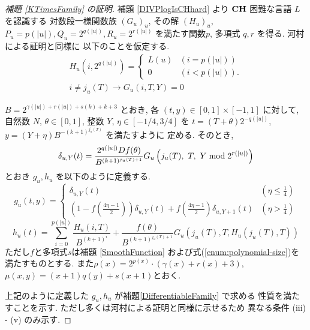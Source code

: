  \begin{proof}[\rm 補題 \ref{KTimesFamily} の証明]
  補題 \ref{DIVPlogIsCHhard} より
  $\mathbf{CH}$ 困難な言語 $L$ を認識する
  対数段一様関数族 $(G_u)_u$, その解 $(H_u)_u$, 
  $P_u = p(|u|), Q_u = 2^{q(|u|)}, R_u = 2^{r(|u|)}$ を満たす関数$p$, 
  多項式 $q,r$ を得る.
  河村による証明と同様に
  以下のことを仮定する\cite[補題4.1]{kawamura2010lipschitz}.
  \begin{gather}
   H_u(i, 2^{q(|u|)}) = \begin{cases}
			L(u) & (i=p(|u|)) \\
			0 & (i<p(|u|)).
			\end{cases}
   \\
   i \not = j_u(T)  \to G_u(i, T, Y) = 0 
  \end{gather}
  

 $B = 2^{\gamma(|u|) + r(|u|) + s(k) + k + 3}$ とおき, 
 各 $(t, y) \in [0,1] \times [-1, 1]$ に対して,
 自然数 $N$, $\theta \in [0,1]$, 整数 $Y$, $\eta \in [-1/4, 3/4]$ を
 $t = (T + \theta)2^{-q(|u|)}$, $y = (Y + \eta)B^{-(k+1)^{j_u(T)}}$ を満たすように
 定める.
  そのとき,
 \begin{equation}
  \delta_{u, Y} (t) = \frac{2^{q(|u|)} D f(\theta)}{B^{(k+1)^{j_u(T)+1}}} 
   G_u\left( j_u(T),\ T,\ Y \bmod 2^{r(|u|)} \right)
 \end{equation}
 とおき $g_u, h_u$ を以下のように定義する.
 \begin{equation}
  \label{eq:gu}
  g_u(t,y) 
  = \begin{cases}
     \delta_{u, Y}(t)
     & (\eta \le \frac 1 4)
     \\
     ( 1-f ( \frac{4\eta-1}{2})) \delta_{u, Y}(t) 
     + f ( \frac{4\eta-1}{2}) \delta_{u,Y+1}(t)
     & (\eta > \frac 1 4)
    \end{cases}
 \end{equation}
 \begin{equation} 
  h_u(t) 
   = \sum^{p(|u|)}_{i=0} \frac{H_u(i, T)}{B^{(k+1)^i}}  
  + \frac{f(\theta)}{B^{(k+1)^{j_u(T)+1}}} G_u(j_u(T), T, H_u(j_u(T), T)) 
  \label{eq:hu}
 \end{equation}
  ただし$f$と多項式$s$は補題 \ref{SmoothFunction}
  および式(\ref{enum:polynomial-size})を満たすものとする.
  また$\rho(x) = 2^{p(x)} \cdot (\gamma(x) + r(x) + 3)$, 
  $\mu(x, y) = (x+1)q(y) + s(x+1)$とおく.


 上記のように定義した $g_u, h_u$ が補題\ref{DifferentiableFamily} で求める
 性質を満たすことを示す. ただし多くは河村による証明と同様に示せるため
  異なる条件 (iii) - (v) のみ示す\cite[補題4.1]{kawamura2010lipschitz}.
 

\end{proof}
